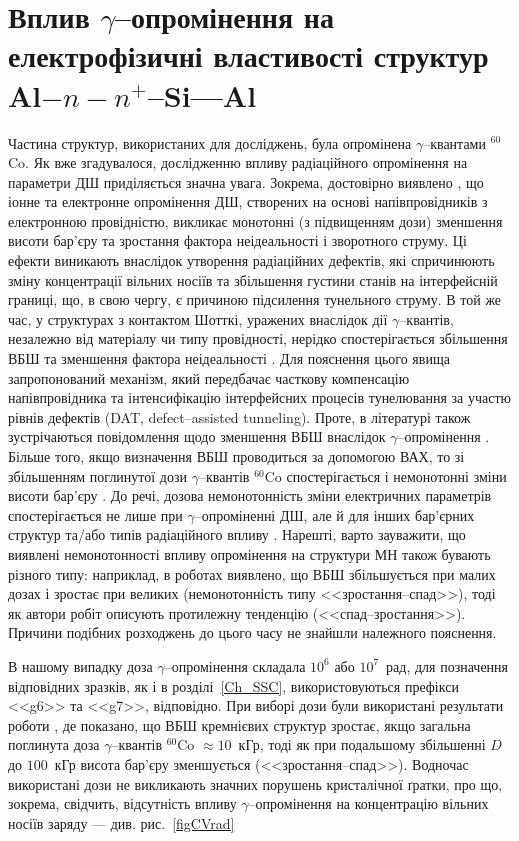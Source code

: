 \section{Вплив $\gamma$--опромінення на електрофізичні властивості структур Al$-n-n^+$--Si---Al\label{MSSi_Rad}}
Частина структур, використаних для досліджень, була опромінена $\gamma$--квантами $^{60}$Co.
Як вже згадувалося, дослідженню впливу радіаційного опромінення на параметри ДШ приділяється значна увага.
Зокрема, достовірно виявлено \cite{Kumar1, Rao, Kumar2, Sharma, Ohyama}, що іонне та електронне опромінення ДШ,
створених на основі напівпровідників з електронною провідністю, викликає
монотонні (з підвищенням дози) зменшення висоти бар'єру та зростання фактора неідеальності і зворотного струму.
Ці ефекти виникають внаслідок утворення радіаційних дефектів, які спричинюють зміну концентрації вільних носіїв та
збільшення густини станів на інтерфейсній границі, що, в свою чергу, є причиною підсилення тунельного струму.
В той же час, у структурах з контактом Шотткі, уражених внаслідок дії $\gamma$--квантів, незалежно від матеріалу чи типу провідності,
нерідко спостерігається збільшення ВБШ та зменшення фактора неідеальності \cite{Tataroglu,Tascioglu2010old,Tataroglu:2007NIMA}.
Для пояснення цього явища запропонований \cite{Tataroglu:2007NIMA} механізм, який передбачає
часткову компенсацію напівпровідника та інтенсифікацію інтерфейсних процесів тунелювання за участю рівнів дефектів (DAT, defect--assisted tunneling).
Проте, в літературі також зустрічаються повідомлення щодо зменшення ВБШ внаслідок $\gamma$--опромінення \cite{Tataroglu3}.
Більше того, якщо визначення ВБШ проводиться за допомогою ВАХ, то зі збільшенням поглинутої дози $\gamma$--квантів $^{60}$Co спостерігається
і немонотонні зміни висоти бар'єру \cite{Karatas:2006NIMA,Umana,Verma}.
До речі, дозова немонотонність зміни електричних параметрів спостерігається не лише при $\gamma$--опроміненні ДШ,
але й для інших бар'єрних структур \cite{Kinoshita} та/або типів радіаційного впливу \cite{Vorobets, Pattabi, Kovalyuk}.
Нарешті, варто зауважити, що виявлені немонотонності впливу опромінення на структури МН також бувають різного типу:
наприклад, в роботах \cite{Karatas:2006NIMA, Vorobets, Pattabi} виявлено, що ВБШ збільшується
при малих дозах і зростає при великих (немонотонність типу <<зростання--спад>>), тоді як автори робіт \cite{Umana,Verma} описують протилежну тенденцію (<<спад--зростання>>).
Причини подібних розходжень до цього часу не знайшли належного пояснення.

В нашому випадку доза $\gamma$--опромінення складала $10^6$ або $10^7$~рад, для позначення відповідних зразків, як і в розділі~\ref{Ch_SSC}, використовуються префікси <<g6>> та <<g7>>, відповідно.
При виборі дози були використані результати роботи \cite{Karatas:2006NIMA}, де показано,
що ВБШ кремнієвих структур зростає, якщо загальна поглинута доза $\gamma$--квантів $^{60}$Co $\approx10$~кГр, тоді як при подальшому збільшенні
$D$ до $100$~кГр висота бар'єру зменшується (<<зростання--спад>>).
Водночас використані дози не викликають значних порушень кристалічної ґратки,
про що, зокрема, свідчить, відсутність впливу $\gamma$--опромінення на концентрацію вільних носіїв заряду --- див. рис.~\ref{figCVrad}

